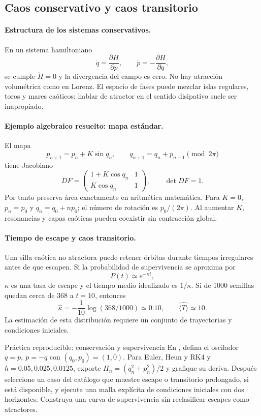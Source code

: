 \subsection{Caos conservativo y caos transitorio}

\paragraph{Estructura de los sistemas conservativos.}
En un sistema hamiltoniano
\[
 \dot q=\frac{\partial H}{\partial p},\qquad
 \dot p=-\frac{\partial H}{\partial q},
\]
se cumple \(\dot H=0\) y la divergencia del campo es cero. No hay atracción
volumétrica como en Lorenz. El espacio de fases puede mezclar islas regulares, toros y
mares caóticos; hablar de atractor en el sentido disipativo suele ser inapropiado.

\paragraph{Ejemplo algebraico resuelto: mapa estándar.}
El mapa
\[
 p_{n+1}=p_n+K\sin q_n,\qquad
 q_{n+1}=q_n+p_{n+1}\pmod{2\pi}
\]
tiene Jacobiano
\[
 D F=
 \begin{pmatrix}
 1+K\cos q_n&1\\
 K\cos q_n&1
 \end{pmatrix},
\qquad \det DF=1.
\]
Por tanto preserva área exactamente en aritmética matemática. Para \(K=0\),
\(p_n=p_0\) y \(q_n=q_0+np_0\); el número de rotación es \(p_0/(2\pi)\). Al aumentar
\(K\), resonancias y capas caóticas pueden coexistir sin contracción global.

\paragraph{Tiempo de escape y caos transitorio.}
Una silla caótica no atractora puede retener órbitas durante tiempos irregulares antes
de que escapen. Si la probabilidad de supervivencia se aproxima por
\[
 P(t)\simeq e^{-\kappa t},
\]
\(\kappa\) es una tasa de escape y el tiempo medio idealizado es \(1/\kappa\). Si de
1000 semillas quedan cerca de 368 a \(t=10\), entonces
\[
 \widehat\kappa=-\frac1{10}\log(368/1000)\simeq0.10,
\qquad \widehat{\langle T\rangle}\simeq10.
\]
La estimación de esta distribución requiere un conjunto de trayectorias y condiciones iniciales.

\begin{activitybox}{Práctica reproducible: conservación y supervivencia}
En , defina el oscilador
\(\dot q=p,\ \dot p=-q\) con \((q_0,p_0)=(1,0)\). Para Euler, Heun y RK4 y
\(h=0.05,0.025,0.0125\), exporte \(H_n=(q_n^2+p_n^2)/2\) y grafique su deriva.
Después seleccione un caso del catálogo que muestre escape o transitorio prolongado,
si está disponible, y ejecute una malla explícita de condiciones iniciales con dos
horizontes. Construya una curva de supervivencia sin reclasificar escapes como
atractores.
\end{activitybox}

